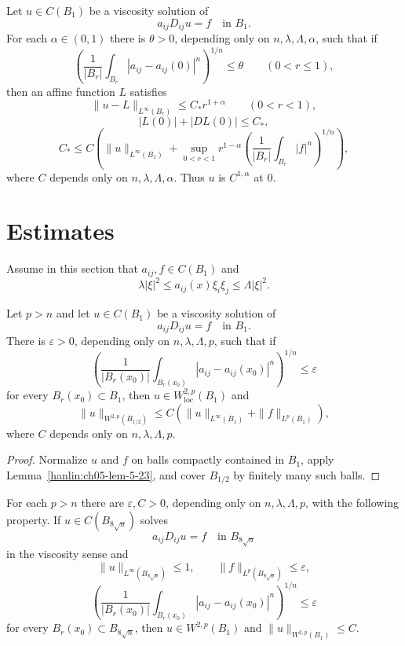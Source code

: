 \begin{theorem}\label{hanlin:ch05-thm-5-21}
Let $u\in C(B_1)$ be a viscosity solution of
\[
a_{ij}D_{ij}u=f\quad\text{in }B_1.
\]
For each $\alpha\in(0,1)$ there is $\theta>0$, depending only on
$n,\lambda,\Lambda,\alpha$, such that if
\[
\left(\frac1{|B_r|}\int_{B_r}|a_{ij}-a_{ij}(0)|^n\right)^{1/n}
\leq\theta\qquad(0<r\leq1),
\]
then an affine function $L$ satisfies
\[
\|u-L\|_{L^\infty(B_r)}\leq C_*r^{1+\alpha}\qquad(0<r<1),
\]
\[
|L(0)|+|DL(0)|\leq C_*,
\]
\[
C_*\leq C\left(\|u\|_{L^\infty(B_1)}+
\sup_{0<r<1}r^{1-\alpha}
\left(\frac1{|B_r|}\int_{B_r}|f|^n\right)^{1/n}\right),
\]
where $C$ depends only on $n,\lambda,\Lambda,\alpha$. Thus $u$ is
$C^{1,\alpha}$ at $0$.
\end{theorem}

\section{\Wtwop Estimates}

Assume in this section that $a_{ij},f\in C(B_1)$ and
\[
\lambda|\xi|^2\leq a_{ij}(x)\xi_i\xi_j\leq\Lambda|\xi|^2.
\]

\begin{theorem}\label{hanlin:ch05-thm-5-22}
Let $p>n$ and let $u\in C(B_1)$ be a viscosity solution of
\[
a_{ij}D_{ij}u=f\quad\text{in }B_1.
\]
There is $\varepsilon>0$, depending only on $n,\lambda,\Lambda,p$, such
that if
\[
\left(\frac1{|B_r(x_0)|}\int_{B_r(x_0)}
|a_{ij}-a_{ij}(x_0)|^n\right)^{1/n}\leq\varepsilon
\]
for every $B_r(x_0)\subset B_1$, then $u\in W^{2,p}_{\mathrm{loc}}(B_1)$
and
\[
\|u\|_{W^{2,p}(B_{1/2})}
\leq C\left(\|u\|_{L^\infty(B_1)}+\|f\|_{L^p(B_1)}\right),
\]
where $C$ depends only on $n,\lambda,\Lambda,p$.
\end{theorem}
\begin{proof}
\sketch Normalize $u$ and $f$ on balls compactly contained in $B_1$,
apply Lemma~\ref{hanlin:ch05-lem-5-23}, and cover $B_{1/2}$ by finitely
many such balls.
\end{proof}

\begin{lemma}\label{hanlin:ch05-lem-5-23}
For each $p>n$ there are $\varepsilon,C>0$, depending only on
$n,\lambda,\Lambda,p$, with the following property. If
$u\in C(B_{8\sqrt n})$ solves
\[
a_{ij}D_{ij}u=f\quad\text{in }B_{8\sqrt n}
\]
in the viscosity sense and
\[
\|u\|_{L^\infty(B_{8\sqrt n})}\leq1,\qquad
\|f\|_{L^p(B_{8\sqrt n})}\leq\varepsilon,
\]
\[
\left(\frac1{|B_r(x_0)|}\int_{B_r(x_0)}
|a_{ij}-a_{ij}(x_0)|^n\right)^{1/n}\leq\varepsilon
\]
for every $B_r(x_0)\subset B_{8\sqrt n}$, then
$u\in W^{2,p}(B_1)$ and $\|u\|_{W^{2,p}(B_1)}\leq C$.
\end{lemma}

